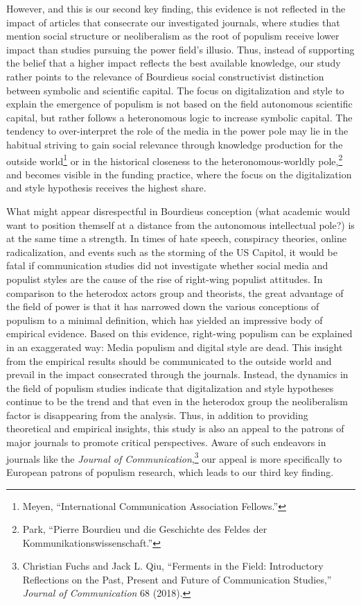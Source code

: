 \documentclass{tufte-handout}
\begin{document}
{{{{However, and this is our second key finding, this evidence is not
reflected in the impact of articles that consecrate our investigated
journals, where studies that mention social structure or neoliberalism
as the root of populism receive lower impact than studies pursuing the
power field's illusio. Thus, instead of supporting the belief that a
higher impact reflects the best available knowledge, our study rather
points to the relevance of Bourdieu\textquotesingle s social
constructivist distinction between symbolic and scientific capital. The
focus on digitalization and style to explain the emergence of populism
is not based on the field autonomous scientific capital, but rather
follows a heteronomous logic to increase symbolic capital. The tendency
to over-interpret the role of the media in the power pole may lie in the
habitual striving to gain social relevance through knowledge production
for the outside world\footnote{Meyen, ``International Communication
  Association Fellows.''} or in the historical closeness to the
heteronomous-worldly pole,\footnote{Park, ``Pierre Bourdieu und die
  Geschichte des Feldes der Kommunikationswissenschaft.''} and becomes
visible in the funding practice, where the focus on the digitalization
and style hypothesis receives the highest share.

What might appear disrespectful in Bourdieu\textquotesingle s conception
(what academic would want to position themself at a distance from the
autonomous intellectual pole?) is at the same time a strength. In times
of hate speech, conspiracy theories, online radicalization, and events
such as the storming of the US Capitol, it would be fatal if
communication studies did not investigate whether social media and
populist styles are the cause of the rise of right-wing populist
attitudes. In comparison to the heterodox actor\textquotesingle s group
and theorists, the great advantage of the field of power is that it has
narrowed down the various conceptions of populism to a minimal
definition, which has yielded an impressive body of empirical evidence.
Based on this evidence, right-wing populism can be explained in an
exaggerated way: Media populism and digital style are dead. This insight
from the empirical results should be communicated to the outside world
and prevail in the impact consecrated through the journals. Instead, the
dynamics in the field of populism studies indicate that digitalization
and style hypotheses continue to be the trend and that even in the
heterodox group the neoliberalism factor is disappearing from the
analysis. Thus, in addition to providing theoretical and empirical
insights, this study is also an appeal to the patrons of major journals
to promote critical perspectives. Aware of such endeavors in journals
like the \emph{Journal of Communication},\footnote{Christian Fuchs and
  Jack L. Qiu, ``Ferments in the Field: Introductory Reflections on the
  Past, Present and Future of Communication Studies,'' \emph{Journal of
  Communication} 68 (2018).} our appeal is more specifically to European
patrons of populism research, which leads to our third key finding.

}}}}
\end{document}
